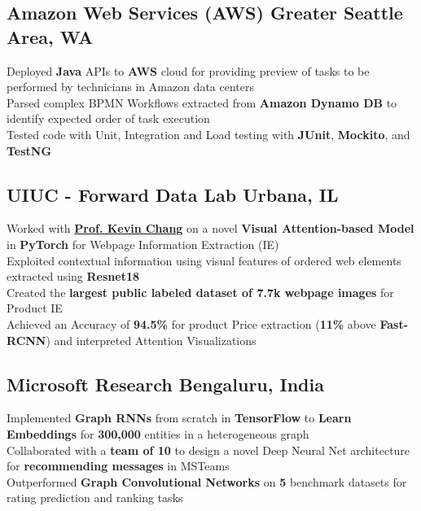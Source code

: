 \documentclass[]{Keval-resume}
\begin{document}
\subsection{Amazon Web Services (AWS) \hfill \normalfont G\lowercase{reater} S\lowercase{eattle} A\lowercase{rea}, WA}
\textbullet{} Deployed \textbf{Java} APIs to \textbf{AWS} cloud for providing preview of tasks to be performed by technicians in Amazon data centers \\
\textbullet{} Parsed complex BPMN Workflows extracted from \textbf{Amazon Dynamo DB} to identify expected order of task execution \\
\textbullet{} Tested code with Unit, Integration and Load testing with \textbf{JUnit}, \textbf{Mockito}, and \textbf{TestNG}
\sectionsep

\subsection{UIUC - Forward Data Lab \hfill \normalfont U\lowercase{rbana}, IL}
\textbullet{} Worked with \href{http://www.forwarddatalab.org/kevinccchang}{\textbf{Prof. Kevin Chang}} on a novel \textbf{Visual Attention-based Model} in \textbf{PyTorch} for Webpage Information Extraction (IE) \\
\textbullet{} Exploited contextual information using visual features of ordered web elements extracted using \textbf{Resnet18} \\
\textbullet{} Created the \textbf{largest public labeled dataset of 7.7k webpage images} for Product IE \\
\textbullet{} Achieved an Accuracy of \textbf{94.5\%} for product Price extraction (\textbf{11\%} above \textbf{Fast-RCNN}) and interpreted Attention Visualizations
\sectionsep

\subsection{Microsoft Research \hfill \normalfont B\lowercase{engaluru}, I\lowercase{ndia}}
\textbullet{} Implemented \textbf{Graph RNNs} from scratch in \textbf{TensorFlow} to \textbf{Learn Embeddings} for \textbf{300,000} entities in a heterogeneous graph \\
\textbullet{} Collaborated with a \textbf{team of 10} to design a novel Deep Neural Net architecture for \textbf{recommending messages} in MSTeams \\
\textbullet{} Outperformed \textbf{Graph Convolutional Networks} on \textbf{5} benchmark datasets for rating prediction and ranking tasks
\sectionsep
\end{document}
